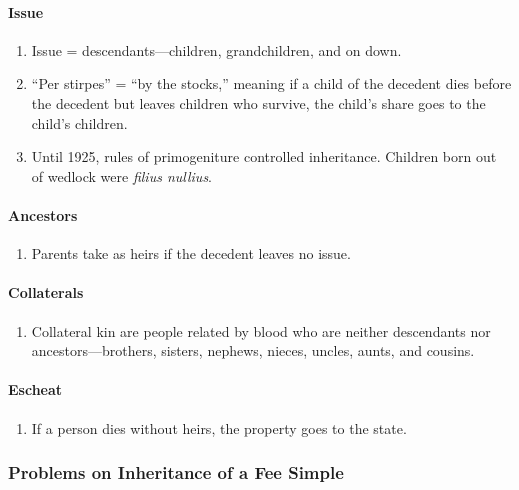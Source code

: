 \paragraph{Issue}

\begin{enumerate}
    \item Issue = descendants---children, grandchildren, and on down.
    \item ``Per stirpes'' = ``by the stocks,'' meaning if a child of the 
    decedent dies before the decedent but leaves children who survive, the 
    child's share goes to the child's children.
    \item Until 1925, rules of primogeniture controlled inheritance. Children 
    born out of wedlock were \emph{filius nullius}.
\end{enumerate}

\paragraph{Ancestors}

\begin{enumerate}
    \item Parents take as heirs if the decedent leaves no issue.
\end{enumerate}

\paragraph{Collaterals}

\begin{enumerate}
    \item Collateral kin are people related by blood who are neither 
    descendants nor ancestors---brothers, sisters, nephews, nieces, uncles, 
    aunts, and cousins.
\end{enumerate}

\paragraph{Escheat}

\begin{enumerate}
    \item If a person dies without heirs, the property goes to the state.
\end{enumerate}

\subsubsection{Problems on Inheritance of a Fee Simple}

